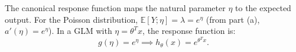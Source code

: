 \begin{answer}
The canonical response function maps the natural parameter $\eta$ to the expected output. For the Poisson distribution, $\mathbb{E}[Y;\eta] = \lambda = e^\eta$ (from part (a), $a'(\eta) = e^\eta$). In a GLM with $\eta = \theta^T x$, the response function is:
\[
g(\eta) = e^\eta \implies h_\theta(x) = e^{\theta^T x}.
\]
\end{answer}
